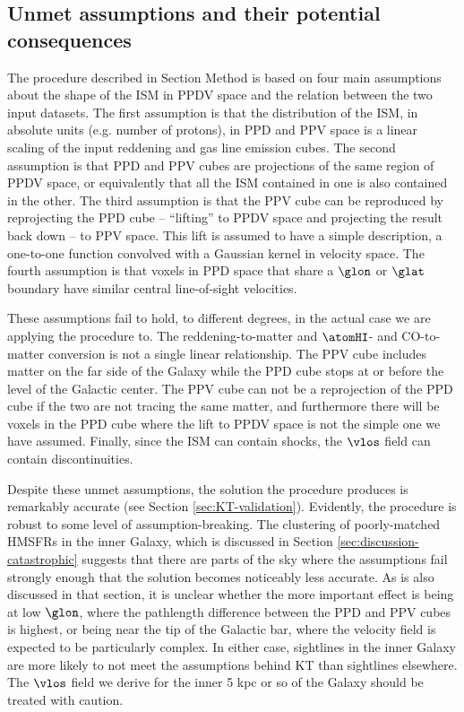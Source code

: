 \subsection{Unmet assumptions and their potential consequences}
\label{sec:discussion-systematics}
The procedure described in Section Method is based on four main assumptions about the shape of the ISM in PPDV space and the relation between the two input datasets.
The first assumption is that the distribution of the ISM, in absolute units (e.g. number of protons), in PPD and PPV space is a linear scaling of the input reddening and gas line emission cubes.
The second assumption is that PPD and PPV cubes are projections of the same region of PPDV space, or equivalently that all the ISM contained in one is also contained in the other.
The third assumption is that the PPV cube can be reproduced by reprojecting the PPD cube -- ``lifting'' to PPDV space and projecting the result back down -- to PPV space.
This lift is assumed to have a simple description, a one-to-one function convolved with a Gaussian kernel in velocity space.
The fourth assumption is that voxels in PPD space that share a $\glon$ or $\glat$ boundary have similar central line-of-sight velocities.

These assumptions fail to hold, to different degrees, in the actual case we are applying the procedure to. 
The reddening-to-matter and $\atomHI$- and CO-to-matter conversion is not a single linear relationship. 
The PPV cube includes matter on the far side of the Galaxy while the PPD cube stops at or before the level of the Galactic center.
The PPV cube can not be a reprojection of the PPD cube if the two are not tracing the same matter, and furthermore there will be voxels in the PPD cube where the lift to PPDV space is not the simple one we have assumed.
Finally, since the ISM can contain shocks, the $\vlos$ field can contain discontinuities.

Despite these unmet assumptions, the solution the procedure produces is remarkably accurate (see Section \ref{sec:KT-validation}).
Evidently, the procedure is robust to some level of assumption-breaking. 
The clustering of poorly-matched HMSFRs in the inner Galaxy, which is discussed in Section \ref{sec:discussion-catastrophic} suggests that there are parts of the sky where the assumptions fail strongly enough that the solution becomes noticeably less accurate. 
As is also discussed in that section, it is unclear whether the more important effect is being at low $\glon$, where the pathlength difference between the PPD and PPV cubes is highest, or being near the tip of the Galactic bar, where the velocity field is expected to be particularly complex.
In either case, sightlines in the inner Galaxy are more likely to not meet the assumptions behind KT than sightlines elsewhere. 
The $\vlos$ field we derive for the inner 5 kpc or so of the Galaxy should be treated with caution.

